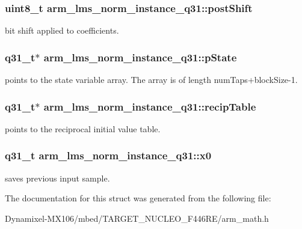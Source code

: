 \subsubsection[{\texorpdfstring{post\+Shift}{postShift}}]{\setlength{\rightskip}{0pt plus 5cm}uint8\+\_\+t arm\+\_\+lms\+\_\+norm\+\_\+instance\+\_\+q31\+::post\+Shift}\hypertarget{structarm__lms__norm__instance__q31_a28d7b9e437817f83397e081967e90f3c}{}\label{structarm__lms__norm__instance__q31_a28d7b9e437817f83397e081967e90f3c}
bit shift applied to coefficients. 
\subsubsection[{\texorpdfstring{p\+State}{pState}}]{\setlength{\rightskip}{0pt plus 5cm}q31\+\_\+t$\ast$ arm\+\_\+lms\+\_\+norm\+\_\+instance\+\_\+q31\+::p\+State}\hypertarget{structarm__lms__norm__instance__q31_a6b25c96cf048b77078d62f4252a01ec4}{}\label{structarm__lms__norm__instance__q31_a6b25c96cf048b77078d62f4252a01ec4}
points to the state variable array. The array is of length num\+Taps+block\+Size-\/1. 
\subsubsection[{\texorpdfstring{recip\+Table}{recipTable}}]{\setlength{\rightskip}{0pt plus 5cm}q31\+\_\+t$\ast$ arm\+\_\+lms\+\_\+norm\+\_\+instance\+\_\+q31\+::recip\+Table}\hypertarget{structarm__lms__norm__instance__q31_a85836d0907077b9ac660f7bbbaa9d694}{}\label{structarm__lms__norm__instance__q31_a85836d0907077b9ac660f7bbbaa9d694}
points to the reciprocal initial value table. 
\subsubsection[{\texorpdfstring{x0}{x0}}]{\setlength{\rightskip}{0pt plus 5cm}q31\+\_\+t arm\+\_\+lms\+\_\+norm\+\_\+instance\+\_\+q31\+::x0}\hypertarget{structarm__lms__norm__instance__q31_a47c4466d644e0d8ba407995adfa9b917}{}\label{structarm__lms__norm__instance__q31_a47c4466d644e0d8ba407995adfa9b917}
saves previous input sample. 

The documentation for this struct was generated from the following file\+:\begin{DoxyCompactItemize}
\item 
Dynamixel-\/\+M\+X106/mbed/\+T\+A\+R\+G\+E\+T\+\_\+\+N\+U\+C\+L\+E\+O\+\_\+\+F446\+R\+E/arm\+\_\+math.\+h\end{DoxyCompactItemize}

